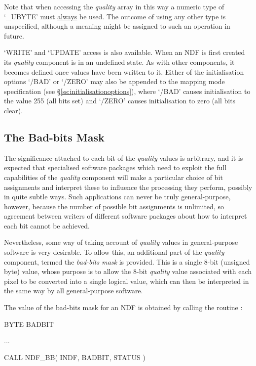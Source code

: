 \documentclass[twoside,11pt,nolof]{starlink}
\providecommand{\st}[1]{{\emph{#1}}}
\begin{document}
Note that when accessing the \st{quality\/} array in this way a numeric type
of `\_UBYTE' must \underline{always} be used.
The outcome of using any other type is unspecified, although a meaning might
be assigned to such an operation in future.

`WRITE' and `UPDATE' access is also available.
When an NDF is first created its \st{quality\/} component is in an undefined
state.
As with other components, it becomes defined once values have been written
to it.
Either of the initialisation options `/BAD' or `/ZERO' may also be appended to
the mapping mode specification (see \S\ref{ss:initialisationoptions}), where
`/BAD' causes initialisation to the value 255 (all bits set) and `/ZERO'
causes initialisation to zero (all bits clear).

\subsection{The Bad-bits Mask}

The significance attached to each bit of the \st{quality\/} values is arbitrary,
and it is expected that specialised software packages which need to exploit the
full capabilities of the \st{quality\/} component will make a particular choice
of bit assignments and interpret these to influence the processing they perform,
possibly in quite subtle ways.
Such applications can never be truly general-purpose, however, because the
number of possible bit assignments is unlimited, so agreement between
writers of different software packages about how to interpret each bit
cannot be achieved.

Nevertheless, some way of taking account of \st{quality\/} values in
general-purpose software is very desirable.
To allow this, an additional part of the \st{quality\/} component, termed the
\st{bad-bits mask\/} is provided.
This is a single 8-bit (unsigned byte) value, whose purpose is to allow the
8-bit \st{quality\/} value associated with each pixel to be converted into a
single logical value, which can then be interpreted in the same way by all
general-purpose software.

The value of the bad-bits mask for an NDF is obtained by calling the routine
:

\small
\begin{terminalv}
      BYTE BADBIT

      ...

      CALL NDF_BB( INDF, BADBIT, STATUS )
\end{terminalv}
\normalsize
\end{document}
